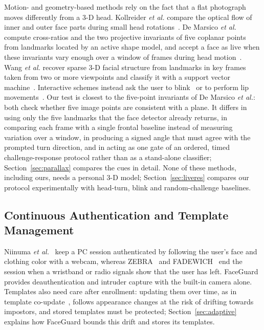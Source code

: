 \documentclass[journal]{IEEEtran}
\newcommand{\sys}{FaceGuard}
\begin{document}
Motion- and geometry-based methods rely on the fact that a flat photograph moves differently from a 3-D head. Kollreider \emph{et al.} compare the optical flow of inner and outer face parts during small head rotations~\cite{kollreider2007motion}. De Marsico \emph{et al.} compute cross-ratios and the two projective invariants of five coplanar points from landmarks located by an active shape model, and accept a face as live when these invariants vary enough over a window of frames during head motion~\cite{demarsico2012projective}. Wang \emph{et al.} recover sparse 3-D facial structure from landmarks in key frames taken from two or more viewpoints and classify it with a support vector machine~\cite{wang2013structure}. Interactive schemes instead ask the user to blink~\cite{pan2007eyeblink} or to perform lip movements~\cite{zhou2024lipmotion}. Our test is closest to the five-point invariants of De Marsico \emph{et al.}: both check whether five image points are consistent with a plane. It differs in using only the five landmarks that the face detector already returns, in comparing each frame with a single frontal baseline instead of measuring variation over a window, in producing a signed angle that must agree with the prompted turn direction, and in acting as one gate of an ordered, timed challenge-response protocol rather than as a stand-alone classifier; Section~\ref{sec:parallax} compares the cues in detail. None of these methods, including ours, needs a personal 3-D model; Section~\ref{sec:liveres} compares our protocol experimentally with head-turn, blink and random-challenge baselines.

\subsection{Continuous Authentication and Template Management}
Niinuma \emph{et al.}~\cite{niinuma2010soft} keep a PC session authenticated by following the user's face and clothing color with a webcam, whereas ZEBRA~\cite{mare2014zebra} and FADEWICH~\cite{conti2017fadewich} end the session when a wristband or radio signals show that the user has left. \sys{} provides deauthentication and intruder capture with the built-in camera alone. Templates also need care after enrollment: updating them over time, as in template co-update~\cite{rattani2008coupdate}, follows appearance changes at the risk of drifting towards impostors, and stored templates must be protected; Section~\ref{sec:adaptive} explains how \sys{} bounds this drift and stores its templates.
\end{document}
